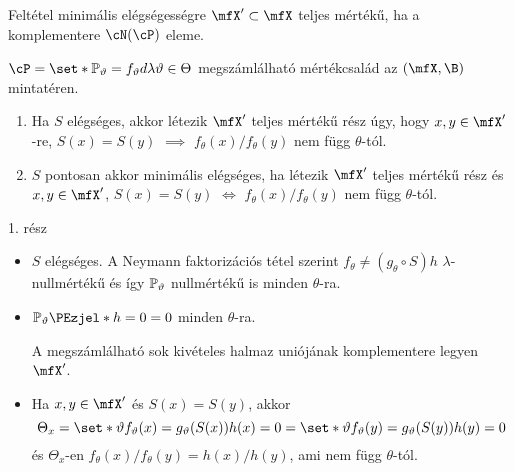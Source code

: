 \documentclass[aspectratio=169,notheorems,9pt,\option]{beamer}
\begin{document}
\begin{frame}{Feltétel minimális elégségességre}
  $\mfX'\subset\mfX$ teljes mértékű, ha a komplementere $\cN(\cP)$ eleme.
  \begin{theorem} $\cP=\set*{\P[\theta]=f_\theta d\lambda}{\theta\in\Theta}$ megszámlálható
     mértékcsalád az $(\mfX,\B)$ mintatéren.
    \begin{enumerate}[<*>]
      \item Ha $S$ elégséges, akkor létezik $\mfX'$ teljes mértékű rész úgy, hogy $x,y\in\mfX'$-re, $S(x)=S(y)$ $\implies$  
      $f_\theta(x)/f_\theta(y)$ nem függ $\theta$-tól.
      \item $S$ pontosan akkor minimális elégséges, ha létezik $\mfX'$ teljes mértékű rész és $x,y\in\mfX'$, 
      $S(x)=S(y)$ $\iff$  $f_\theta(x)/f_\theta(y)$ nem függ $\theta$-tól.
    \end{enumerate}
  \end{theorem}
  1. rész
  \begin{itemize}
    \item $S$ elégséges. A Neymann faktorizációs tétel szerint
    $f_\theta\neq (g_\theta\circ S)h$ $\lambda$-nullmértékű
    és így $\P[\theta]$ nullmértékű is minden $\theta$-ra. 

    \item $\P[\theta]{h=0}=0$  minden $\theta$-ra.
    
    A megszámlálható sok kivételes halmaz uniójának komplementere legyen $\mfX'$.
    
    \item Ha $x,y\in\mfX'$ és $S(x)=S(y)$, akkor 
    \begin{displaymath}
      \Theta_{x}=\set*{\theta}{f_\theta(x)=g_\theta(S(x))h(x)=0}
      =\set*{\theta}{f_\theta(y)=g_\theta(S(y))h(y)=0}
    \end{displaymath} 
    és $\Theta_x$-en
    $f_\theta(x)/f_\theta(y)=h(x)/h(y)$, ami nem függ $\theta$-tól.

  \end{itemize}
\end{frame}
\end{document}
